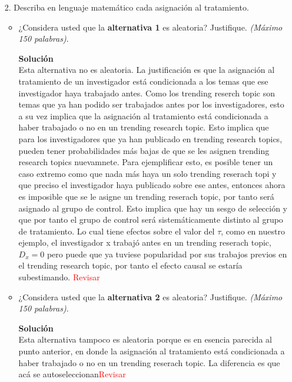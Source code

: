 \documentclass[a4paper, answers, addpoints, 11pt]{exam}
\begin{document}
\bigskip
\begin{itemize}
    \item[2.] Describa en lenguaje matemático cada asignación al tratamiento.
    
    \begin{itemize}
        \item ¿Considera usted que la \textbf{alternativa 1} es aleatoria? Justifique. \textit{(Máximo 150 palabras)}.
         \begin{mdframed}
        \textbf{Solución}\\
      Esta alternativa no es aleatoria. La justificación es que la asignación al tratamiento de un investigador está condicionada a los temas que ese investigador haya trabajado antes. Como los trending reserch topic son temas que ya han podido ser trabajados antes por los investigadores, esto a su vez implica que la asignación al tratamiento está condicionada a haber trabajado o no en un trending research topic. Esto implica que para los investigadores que ya han publicado en trending research topics, pueden tener probabilidades más bajas de que se les asignen trending research topics nuevamnete. Para ejemplificar esto, es posible tener un caso extremo como que nada más haya un solo trending reserach topi y que preciso el investigador haya publicado sobre ese antes, entonces ahora es imposible que se le asigne un trending reserach topic, por tanto será asignado al grupo de control. Esto implica que hay un sesgo de selección y que por tanto el grupo de control será sistemáticamente distinto al grupo de tratamiento. Lo cual tiene efectos sobre el valor del $\tau$, como en nuestro ejemplo, el investigador x trabajó antes en un trending reserach topic,  $D_x=0$ pero puede que ya tuviese popularidad por sus trabajos previos en el trending research topic, por tanto el efecto causal se estaría subestimando. \textcolor{red}{Revisar}
        \end{mdframed}
        
        \item ¿Considera usted que la \textbf{alternativa 2} es aleatoria? Justifique. \textit{(Máximo 150 palabras)}.
         \begin{mdframed}
        \textbf{Solución}\\
        Esta alternativa tampoco es aleatoria porque es en esencia parecida al punto anterior, en donde la asignación al tratamiento está condicionada a haber trabajado o no en un trending reserach topic. La diferencia es que acá se autoseleccionan\textcolor{red}{Revisar}
        \end{mdframed}
        

\end{itemize}
\end{itemize}
\end{document}

